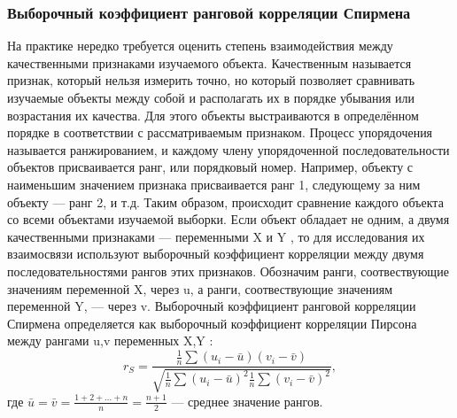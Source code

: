 \documentclass[12pt,a4paper]{scrartcl}
\begin{document}
	\subsubsection{Выборочный коэффициент ранговой корреляции Спирмена}
    На практике нередко требуется оценить степень взаимодействия между качественными признаками изучаемого объекта. Качественным называется признак, который нельзя измерить точно, но который позволяет сравнивать изучаемые объекты между собой и располагать их в порядке убывания или возрастания их качества. Для этого объекты выстраиваются в определённом порядке в соответствии с рассматриваемым признаком. Процесс упорядочения называется ранжированием, и каждому члену упорядоченной последовательности объектов присваивается ранг, или порядковый номер. Например, объекту с наименьшим значением признака присваивается ранг 1, следующему за ним объекту — ранг 2, и т.д. Таким образом, происходит сравнение каждого объекта со всеми объектами изучаемой выборки.
    \newline
    Если объект обладает не одним, а двумя качественными признаками — переменными X и Y , то для исследования их взаимосвязи используют выборочный коэффициент корреляции между двумя последовательностями рангов этих признаков.
    \newline
    Обозначим ранги, соотвествующие значениям переменной X, через u, а ранги, соотвествующие значениям переменной Y, — через v.
    \newline
    Выборочный коэффициент ранговой корреляции Спирмена определяется как выборочный коэффициент корреляции Пирсона между рангами u,v переменных X,Y :
    \begin{equation}
         r_{S} = \frac{
	    \frac{1}{n}\sum{(u_{i} - \bar{u})(v_{i}-\bar{v})}
	    }{
	    \sqrt{\frac{1}{n}\sum{(u_{i} - \bar{u})^{2}}\frac{1}{n}\sum{(v_{i} - \bar{v})^{2}}}
	    },
	    \label{rS}
    \end{equation}
    где $\bar{u} = \bar{v} = \frac{1 + 2 + ... + n}{n} = \frac{n + 1}{2}$ — среднее значение рангов.

	
\end{document}
